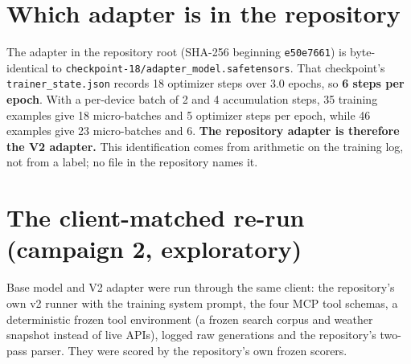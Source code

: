 \documentclass[10.5pt,a4paper,oneside]{report}
\begin{document}
\section{Which adapter is in the repository}
The adapter in the repository root (SHA-256 beginning \texttt{e50e7661}) is byte-identical to \texttt{checkpoint-18/\allowbreak{}adapter\_\allowbreak{}model.\allowbreak{}safetensors}. That checkpoint's \texttt{trainer\_\allowbreak{}state.\allowbreak{}json} records 18 optimizer steps over 3.0 epochs, so \textbf{6 steps per epoch}. With a per-device batch of 2 and 4 accumulation steps, 35 training examples give 18 micro-batches and 5 optimizer steps per epoch, while 46 examples give 23 micro-batches and 6. \textbf{The repository adapter is therefore the V2 adapter.} This identification comes from arithmetic on the training log, not from a label; no file in the repository names it.

\section{The client-matched re-run (campaign 2, exploratory)}
Base model and V2 adapter were run through the same client: the repository's own v2 runner with the training system prompt, the four MCP tool schemas, a deterministic frozen tool environment (a frozen search corpus and weather snapshot instead of live APIs), logged raw generations and the repository's two-pass parser. They were scored by the repository's own frozen scorers.
\end{document}
